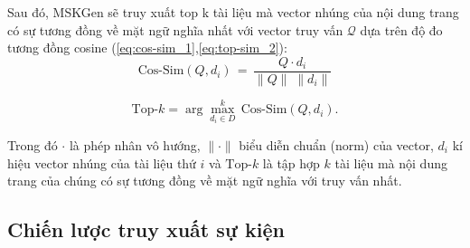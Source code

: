 Sau đó, MSKGen sẽ truy xuất top k tài liệu mà vector nhúng của nội dung trang có sự tương đồng về mặt ngữ nghĩa nhất với vector truy vấn $\mathcal{Q}$ dựa trên độ đo tương đồng cosine (\ref{eq:cos-sim_1},\ref{eq:top-sim_2}):
\begin{equation}  
\label{eq:cos-sim_1}  
\text{Cos-Sim}(Q, d_{i})   
\,=\, \frac{Q \cdot d_{i}}{\|Q\|\;\|d_{i}\|}  
\end{equation}

\begin{equation}  
\label{eq:top-sim_2}  
\text{Top-}k   
= \arg\max_{d_i \in D}^{k}\,\text{Cos-Sim}(Q, d_i).    
\end{equation} 

Trong đó $\cdot$ là phép nhân vô hướng, $\|\cdot\|$ biểu diễn chuẩn (norm) của vector, $d_{i}$ kí hiệu vector nhúng của tài liệu thứ $i$ và $\text{Top-}k$ là tập hợp $k$ tài liệu mà nội dung trang của chúng có sự tương đồng về mặt ngữ nghĩa với truy vấn nhất.

\vspace{1em}
\subsection{Chiến lược truy xuất sự kiện}

